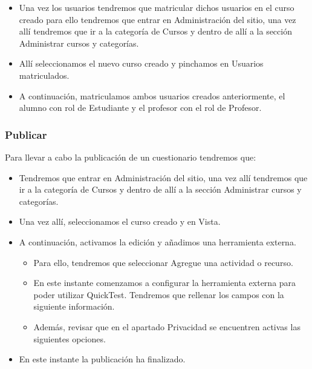 \begin{itemize}
	\item Una vez los usuarios tendremos que matricular dichos usuarios en el curso creado para ello tendremos que entrar en Administración del sitio, una vez allí tendremos que ir a la categoría de Cursos y dentro de allí a la sección Administrar cursos y categorías.
	
	\item Allí seleccionamos el nuevo curso creado y pinchamos en Usuarios matriculados.
	
	\item A continuación, matriculamos ambos usuarios creados anteriormente, el alumno con rol de Estudiante y el profesor con el rol de Profesor.
	
	

\end{itemize}

\subsubsection{Publicar}

Para llevar a cabo la publicación de un cuestionario tendremos que:

\begin{itemize}

	\item Tendremos que entrar en Administración del sitio, una vez allí tendremos que ir a la categoría de Cursos y dentro de allí a la sección Administrar cursos y categorías.
	
	\item Una vez allí, seleccionamos el curso creado y en Vista.
	
	\item A continuación, activamos la edición y añadimos una herramienta externa.
	
	\begin{itemize}
	
			\item Para ello, tendremos que seleccionar Agregue una actividad o recurso. 
			\item En este instante comenzamos a configurar la herramienta externa para poder utilizar QuickTest. Tendremos que rellenar los campos con la siguiente información. 
			
			\item Además, revisar que en el apartado Privacidad se encuentren activas las siguientes opciones. 
	
	\end{itemize}
	
	\item En este instante la publicación ha finalizado.

\end{itemize}

